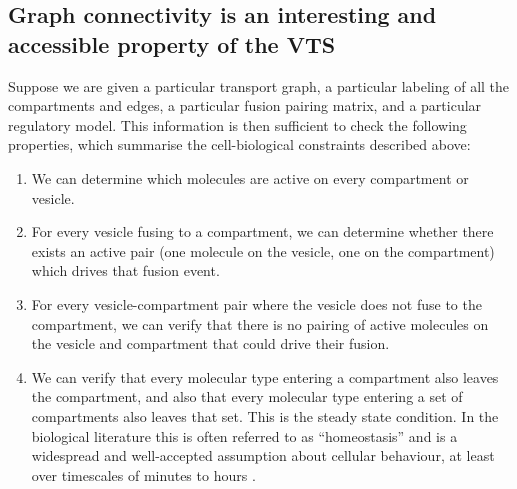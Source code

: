 
%
%
\subsection{Graph connectivity is an interesting and accessible property of the VTS} 
%
Suppose we are given a particular transport graph, a particular labeling of all the compartments and edges, a particular fusion pairing matrix, and a particular regulatory model. This information is then sufficient to check the following properties, which summarise the cell-biological constraints described above:
\begin{enumerate}
	\item We can determine which molecules are active on every compartment or vesicle.
	\item For every vesicle fusing to a compartment, we can determine whether there exists an active pair (one molecule on the vesicle, one on the compartment) which drives that fusion event.
	\item For every vesicle-compartment pair where the vesicle does not fuse to the compartment, we can verify that there is no pairing of active molecules on the
	vesicle and compartment that could drive their fusion.
	\item We can verify that every molecular type entering a compartment also leaves the compartment, and also that every molecular type entering a set of compartments also leaves that set. This is the steady state condition. In the biological literature this is often referred to as “homeostasis” and is a widespread and well-accepted assumption about cellular behaviour, at least over timescales of minutes to hours \cite{mani2016stacking}.
\end{enumerate}

